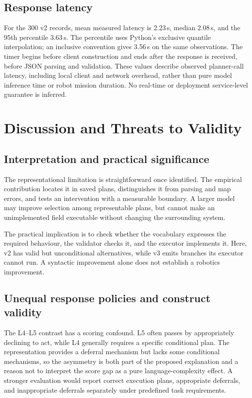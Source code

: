 \documentclass[journal]{IEEEtran}
\begin{document}
\subsection{Response latency}
For the 300 v2 records, mean measured latency is 2.23\,s, median 2.08\,s, and the 95th percentile 3.63\,s. The percentile uses Python's exclusive quantile interpolation; an inclusive convention gives 3.56\,s on the same observations. The timer begins before client construction and ends after the response is received, before JSON parsing and validation. These values describe observed planner-call latency, including local client and network overhead, rather than pure model inference time or robot mission duration. No real-time or deployment service-level guarantee is inferred.

\section{Discussion and Threats to Validity}
\label{sec:threats}
\subsection{Interpretation and practical significance}
The representational limitation is straightforward once identified. The empirical contribution locates it in saved plans, distinguishes it from parsing and map errors, and tests an intervention with a measurable boundary. A larger model may improve selection among representable plans, but cannot make an unimplemented field executable without changing the surrounding system.

The practical implication is to check whether the vocabulary expresses the required behaviour, the validator checks it, and the executor implements it. Here, v2 has valid but unconditional alternatives, while v3 emits branches its executor cannot run. A syntactic improvement alone does not establish a robotics improvement.

\subsection{Unequal response policies and construct validity}
The L4--L5 contrast has a scoring confound. L5 often passes by appropriately declining to act, while L4 generally requires a specific conditional plan. The representation provides a deferral mechanism but lacks some conditional mechanisms, so the asymmetry is both part of the proposed explanation and a reason not to interpret the score gap as a pure language-complexity effect. A stronger evaluation would report correct execution plans, appropriate deferrals, and inappropriate deferrals separately under predefined task requirements.
\end{document}
